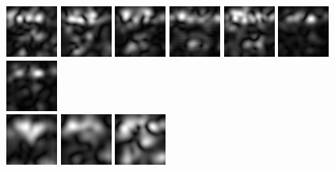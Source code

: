 \begin{figure}
\begin{center}
 \includegraphics[scale=0.5]{ch4/figures/mag_0_1.jpg}
 \includegraphics[scale=0.5]{ch4/figures/mag_0_2.jpg}
 \includegraphics[scale=0.5]{ch4/figures/mag_0_3.jpg}
 \includegraphics[scale=0.5]{ch4/figures/mag_0_4.jpg}
 \includegraphics[scale=0.5]{ch4/figures/mag_0_5.jpg}
 \includegraphics[scale=0.5]{ch4/figures/mag_0_6.jpg}
 \includegraphics[scale=0.5]{ch4/figures/mag_0_7.jpg}\\
 \includegraphics[scale=0.5]{ch4/figures/mag_1_0.jpg}
 \includegraphics[scale=0.5]{ch4/figures/mag_1_1.jpg}
 \includegraphics[scale=0.5]{ch4/figures/mag_1_2.jpg}

\end{center}
\end{figure}
